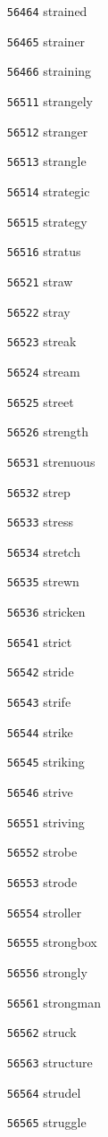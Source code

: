\documentclass[twoside,11pt]{article}
\begin{document}
\begin{multicols}{5}
\begin{enumerate}
\item[\texttt{56464}] strained
\item[\texttt{56465}] strainer
\item[\texttt{56466}] straining
\item[\texttt{56511}] strangely
\item[\texttt{56512}] stranger
\item[\texttt{56513}] strangle
\item[\texttt{56514}] strategic
\item[\texttt{56515}] strategy
\item[\texttt{56516}] stratus
\item[\texttt{56521}] straw
\item[\texttt{56522}] stray
\item[\texttt{56523}] streak
\item[\texttt{56524}] stream
\item[\texttt{56525}] street
\item[\texttt{56526}] strength
\item[\texttt{56531}] strenuous
\item[\texttt{56532}] strep
\item[\texttt{56533}] stress
\item[\texttt{56534}] stretch
\item[\texttt{56535}] strewn
\item[\texttt{56536}] stricken
\item[\texttt{56541}] strict
\item[\texttt{56542}] stride
\item[\texttt{56543}] strife
\item[\texttt{56544}] strike
\item[\texttt{56545}] striking
\item[\texttt{56546}] strive
\item[\texttt{56551}] striving
\item[\texttt{56552}] strobe
\item[\texttt{56553}] strode
\item[\texttt{56554}] stroller
\item[\texttt{56555}] strongbox
\item[\texttt{56556}] strongly
\item[\texttt{56561}] strongman
\item[\texttt{56562}] struck
\item[\texttt{56563}] structure
\item[\texttt{56564}] strudel
\item[\texttt{56565}] struggle

\end{enumerate}
\end{multicols}
\end{document}
